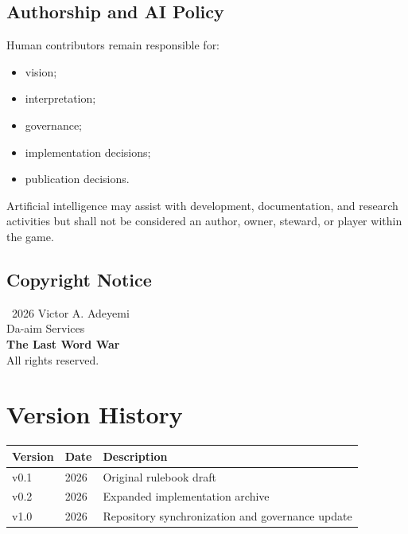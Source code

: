 \documentclass[11pt,a4paper]{article}
\begin{document}
\subsection{Authorship and AI Policy}

Human contributors remain responsible for:

\begin{itemize}
    \item vision;
    \item interpretation;
    \item governance;
    \item implementation decisions;
    \item publication decisions.
\end{itemize}

Artificial intelligence may assist with development,
documentation, and research activities but shall not be
considered an author, owner, steward, or player within the game.

\subsection{Copyright Notice}

\begin{center}
\textcopyright\ 2026 Victor A. Adeyemi\\
Da-aim Services\\
\textbf{The Last Word War\texttrademark}\\
All rights reserved.
\end{center}

\section{Version History}

\begin{center}
\begin{tabular}{lll}
\toprule
\textbf{Version} & \textbf{Date} & \textbf{Description} \\
\midrule
v0.1 & 2026 & Original rulebook draft \\
v0.2 & 2026 & Expanded implementation archive \\
v1.0 & 2026 & Repository synchronization and governance update \\
\bottomrule
\end{tabular}
\end{center}
\end{document}
